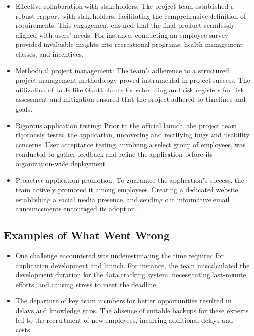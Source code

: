 \begin{itemize}
    \item Effective collaboration with stakeholders: The project team established a robust rapport with stakeholders, facilitating the comprehensive definition of requirements. This engagement ensured that the final product seamlessly aligned with users' needs. For instance, conducting an employee survey provided invaluable insights into recreational programs, health-management classes, and incentives.
    \item Methodical project management: The team's adherence to a structured project management methodology proved instrumental in project success. The utilization of tools like Gantt charts for scheduling and risk registers for risk assessment and mitigation ensured that the project adhered to timelines and goals.
    \item Rigorous application testing: Prior to the official launch, the project team rigorously tested the application, uncovering and rectifying bugs and usability concerns. User acceptance testing, involving a select group of employees, was conducted to gather feedback and refine the application before its organization-wide deployment.
    \item Proactive application promotion: To guarantee the application's success, the team actively promoted it among employees. Creating a dedicated website, establishing a social media presence, and sending out informative email announcements encouraged its adoption.
\end{itemize}

\subsection{Examples of What Went Wrong}

\begin{itemize}
    \item One challenge encountered was underestimating the time required for application development and launch. For instance, the team miscalculated the development duration for the data tracking system, necessitating last-minute efforts, and causing stress to meet the deadline.
    \item The departure of key team members for better opportunities resulted in delays and knowledge gaps. The absence of suitable backups for these experts led to the recruitment of new employees, incurring additional delays and costs.
\end{itemize}

